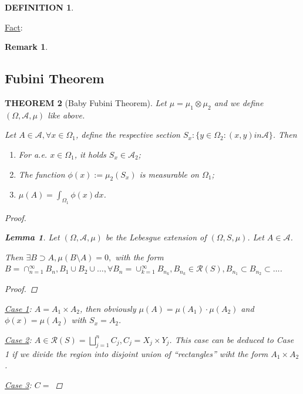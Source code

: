 \documentclass[12pt]{article}
\theoremstyle{blueplain}
\newtheorem{theorem}{THEOREM}[section]
\newtheorem{lemma}[theorem]{Lemma}
\theoremstyle{bluedef}
\newtheorem{definition}{DEFINITION}[section]
\theoremstyle{blueremark}
\newtheorem{remark}{Remark}[section]
\numberwithin{equation}{section}
\begin{document}
\begin{definition}

\end{definition}

\underline{Fact}:

\begin{remark}

\end{remark}

\clearpage

\subsection{Fubini Theorem}

\begin{theorem}[Baby Fubini Theorem]
  Let $\mu = \mu_1 \otimes \mu_2$ and we define $(\Omega, \mathcal{A}, \mu)$ like above.

  Let $A \in \mathcal{A}, \forall x \in \Omega_1$, define the respective section $S_x : \{y \in \Omega_2: (x,y) in \mathcal{A}\}$. Then \begin{enumerate}
    \item For a.e. $x \in \Omega_1$, it holds $S_x \in \mathcal{A}_2$;
    \item The function $\phi(x) := \mu_2(S_x)$ is measurable on $\Omega_1$;
    \item $\mu(A) = \int_{\Omega_1} \phi(x) dx$.
  \end{enumerate}

  \begin{proof}
    \begin{lemma}
      Let $(\Omega, \mathcal{A}, \mu)$  be the Lebesgue extension of $(\Omega, S, \mu)$. Let $A \in \mathcal{A}$.

      Then $\exists B \supset A, \mu(B \setminus A)=0,$ with the form $B = \cap_{n=1}^\infty B_n, B_1 \cup B_2 \cup \ldots, \forall B_n = \cup_{k=1}^\infty B_{n_k}, B_{n_k} \in \mathcal{R}(S), B_{n_1} \subset B_{n_2} \subset \ldots$.
      \begin{proof}

      \end{proof}
    \end{lemma}

    \underline{Case 1}: $A = A_1 \times A_2$, then obviously $\mu(A) = \mu(A_1) \cdot \mu(A_2)$ and $\phi(x) = \mu(A_2)$ with $S_x = A_2$.

    \underline{Case 2}: $A \in \mathcal{R}(S) = \bigsqcup_{j=1}^n C_j, C_j = X_j \times Y_j$. This case can be deduced to Case 1 if we divide the region into disjoint union of ``rectangles'' wiht the form $A_1 \times A_2$.

    \underline{Case 3}: $C = $
  \end{proof}
\end{theorem}
\end{document}
